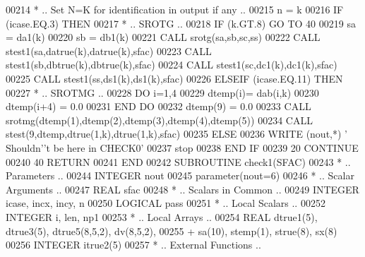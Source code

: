 \begin{DoxyCode}
00214 \textcolor{comment}{*        .. Set N=K for identification in output if any ..}
00215          n = k
00216          \textcolor{keywordflow}{IF} (icase.EQ.3) \textcolor{keywordflow}{THEN}
00217 \textcolor{comment}{*           .. SROTG ..}
00218             \textcolor{keywordflow}{IF} (k.GT.8) \textcolor{keywordflow}{GO TO} 40
00219             sa = da1(k)
00220             sb = db1(k)
00221             \textcolor{keyword}{CALL }srotg(sa,sb,sc,ss)
00222             \textcolor{keyword}{CALL }stest1(sa,datrue(k),datrue(k),sfac)
00223             \textcolor{keyword}{CALL }stest1(sb,dbtrue(k),dbtrue(k),sfac)
00224             \textcolor{keyword}{CALL }stest1(sc,dc1(k),dc1(k),sfac)
00225             \textcolor{keyword}{CALL }stest1(ss,ds1(k),ds1(k),sfac)
00226          \textcolor{keywordflow}{ELSEIF} (icase.EQ.11) \textcolor{keywordflow}{THEN}
00227 \textcolor{comment}{*           .. SROTMG ..}
00228             \textcolor{keywordflow}{DO} i=1,4
00229                dtemp(i)= dab(i,k)
00230                dtemp(i+4) = 0.0
00231 \textcolor{keywordflow}{            END DO}
00232             dtemp(9) = 0.0
00233             \textcolor{keyword}{CALL }srotmg(dtemp(1),dtemp(2),dtemp(3),dtemp(4),dtemp(5))
00234             \textcolor{keyword}{CALL }stest(9,dtemp,dtrue(1,k),dtrue(1,k),sfac)
00235          \textcolor{keywordflow}{ELSE}
00236             \textcolor{keyword}{WRITE} (nout,*) \textcolor{stringliteral}{' Shouldn'}\textcolor{stringliteral}{'t be here in CHECK0'}
00237             stop
00238 \textcolor{keywordflow}{         END IF}
00239    20 \textcolor{keywordflow}{CONTINUE}
00240    40 \textcolor{keywordflow}{RETURN}
00241 \textcolor{keyword}{      END}
00242 \textcolor{keyword}{      SUBROUTINE }check1(SFAC)
00243 \textcolor{comment}{*     .. Parameters ..}
00244       \textcolor{keywordtype}{INTEGER}           nout
00245       parameter(nout=6)
00246 \textcolor{comment}{*     .. Scalar Arguments ..}
00247       \textcolor{keywordtype}{REAL}              sfac
00248 \textcolor{comment}{*     .. Scalars in Common ..}
00249       \textcolor{keywordtype}{INTEGER}           icase, incx, incy, n
00250       \textcolor{keywordtype}{LOGICAL}           pass
00251 \textcolor{comment}{*     .. Local Scalars ..}
00252       \textcolor{keywordtype}{INTEGER}           i, len, np1
00253 \textcolor{comment}{*     .. Local Arrays ..}
00254       \textcolor{keywordtype}{REAL}              dtrue1(5), dtrue3(5), dtrue5(8,5,2), dv(8,5,2),
00255      +                  sa(10), stemp(1), strue(8), sx(8)
00256       \textcolor{keywordtype}{INTEGER}           itrue2(5)
00257 \textcolor{comment}{*     .. External Functions ..}

\end{DoxyCode}
